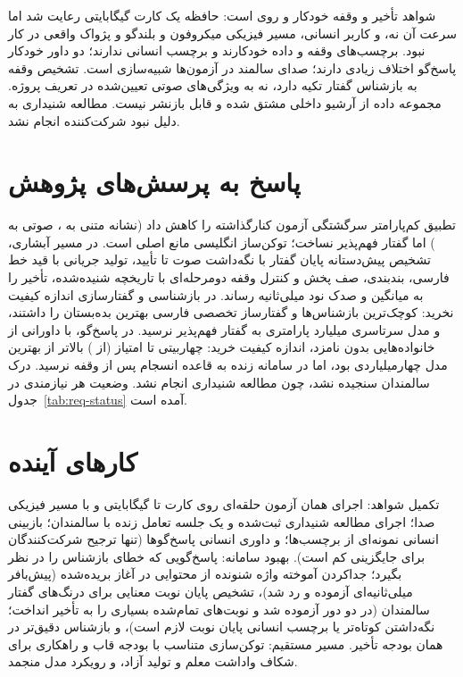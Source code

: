 شواهد تأخیر و وقفه خودکار و روی  است: حافظه یک کارت 
گیگابایتی رعایت شد اما سرعت آن نه، و کاربر انسانی، مسیر فیزیکی میکروفون و
بلندگو و پژواک واقعی در کار نبود. برچسب‌های وقفه و داده خودکارند و برچسب
انسانی ندارند؛ دو داور خودکار پاسخ‌گو اختلاف زیادی دارند؛ صدای
سالمند در آزمون‌ها شبیه‌سازی است. تشخیص وقفه به بازشناس گفتار تکیه دارد، نه
به ویژگی‌های صوتی تعیین‌شده در تعریف پروژه. مجموعه داده از آرشیو داخلی مشتق
شده و قابل بازنشر نیست. مطالعه شنیداری به دلیل نبود شرکت‌کننده انجام نشد.

\section{پاسخ به پرسش‌های پژوهش}

 تطبیق کم‌پارامتر  سرگشتگی آزمون کنارگذاشته را کاهش داد
(نشانه متنی  به ، صوتی  به ) اما گفتار
فهم‌پذیر نساخت؛ توکن‌ساز انگلیسی مانع اصلی است.  در مسیر آبشاری،
تشخیص پیش‌دستانه پایان گفتار با نگه‌داشت صوت تا تأیید، تولید جریانی با قید
خط فارسی، بندبندی، صف پخش و کنترل وقفه دومرحله‌ای با تاریخچه شنیده‌شده، تأخیر را
به میانگین  و صدک نود  میلی‌ثانیه رساند.  در بازشناسی و
گفتارسازی اندازه کیفیت نخرید: کوچک‌ترین بازشناس‌ها و گفتارساز تخصصی فارسی بهترین
بده‌بستان را داشتند، و مدل سرتاسری  میلیارد پارامتری به گفتار فهم‌پذیر نرسید.
در پاسخ‌گو، با داورانی از خانواده‌هایی بدون نامزد، اندازه کیفیت خرید:
 چهاربیتی  تا  امتیاز (از ) بالاتر از بهترین
مدل چهارمیلیاردی بود، اما در سامانه زنده به قاعده انسجام پس از وقفه نرسید.  درک
سالمندان سنجیده نشد، چون مطالعه شنیداری انجام نشد. وضعیت هر نیازمندی در
\mbox{جدول~\ref{tab:req-status}} آمده است.

\section{کارهای آینده}

تکمیل شواهد: اجرای همان آزمون حلقه‌ای روی کارت  تا  گیگابایتی و
با مسیر فیزیکی صدا؛ اجرای مطالعه شنیداری ثبت‌شده و یک جلسه تعامل زنده با
سالمندان؛ بازبینی انسانی نمونه‌ای از برچسب‌ها؛ و داوری انسانی پاسخ‌گوها
(تنها ترجیح شرکت‌کنندگان برای جایگزینی  کم است). بهبود سامانه:
پاسخ‌گویی که خطای بازشناس را در نظر بگیرد؛
جداکردن آموخته واژه شنونده از محتوایی در آغاز بریده‌شده (پیش‌بافر 
میلی‌ثانیه‌ای آزموده و رد شد)، تشخیص پایان نوبت معنایی برای درنگ‌های گفتار سالمندان
(در دو دور آزموده شد و نوبت‌های تمام‌شده بسیاری را به تأخیر انداخت؛ نگه‌داشتن
کوتاه‌تر یا برچسب انسانی پایان نوبت لازم است)، و بازشناس
دقیق‌تر در همان بودجه تأخیر. مسیر مستقیم: توکن‌سازی متناسب با بودجه قاب و
راهکاری برای شکاف واداشت معلم و تولید آزاد، و رویکرد مدل منجمد.
